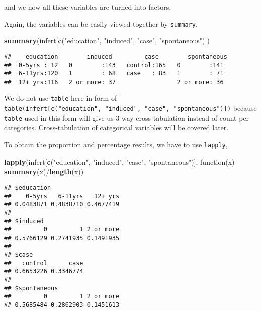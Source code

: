 \documentclass[]{book}
\newenvironment{Shaded}{\begin{snugshade}}{\end{snugshade}}
\newcommand{\KeywordTok}[1]{\textcolor[rgb]{0.13,0.29,0.53}{\textbf{{#1}}}}
\newcommand{\StringTok}[1]{\textcolor[rgb]{0.31,0.60,0.02}{{#1}}}
\newcommand{\NormalTok}[1]{{#1}}
\theoremstyle{definition}
\theoremstyle{definition}
\theoremstyle{remark}
\begin{document}
and we now all these variables are turned into factors.

Again, the variables can be easily viewed together by \texttt{summary},

\begin{Shaded}
\begin{Highlighting}[]
\KeywordTok{summary}\NormalTok{(infert[}\KeywordTok{c}\NormalTok{(}\StringTok{"education"}\NormalTok{, }\StringTok{"induced"}\NormalTok{, }\StringTok{"case"}\NormalTok{, }\StringTok{"spontaneous"}\NormalTok{)])}
\end{Highlighting}
\end{Shaded}

\begin{verbatim}
##    education        induced         case        spontaneous 
##  0-5yrs : 12   0        :143   control:165   0        :141  
##  6-11yrs:120   1        : 68   case   : 83   1        : 71  
##  12+ yrs:116   2 or more: 37                 2 or more: 36
\end{verbatim}

We do not use \texttt{table} here in form of
\texttt{table(infert{[}c("education",\ "induced",\ "case",\ "spontaneous"){]})}
because \texttt{table} used in this form will give us 3-way
cross-tabulation instead of count per categories. Cross-tabulation of
categorical variables will be covered later.

To obtain the proportion and percentage results, we have to use
\texttt{lapply},

\begin{Shaded}
\begin{Highlighting}[]
\KeywordTok{lapply}\NormalTok{(infert[}\KeywordTok{c}\NormalTok{(}\StringTok{"education"}\NormalTok{, }\StringTok{"induced"}\NormalTok{, }\StringTok{"case"}\NormalTok{, }\StringTok{"spontaneous"}\NormalTok{)], }
       \NormalTok{function(x) }\KeywordTok{summary}\NormalTok{(x)/}\KeywordTok{length}\NormalTok{(x))}
\end{Highlighting}
\end{Shaded}

\begin{verbatim}
## $education
##    0-5yrs   6-11yrs   12+ yrs 
## 0.0483871 0.4838710 0.4677419 
## 
## $induced
##         0         1 2 or more 
## 0.5766129 0.2741935 0.1491935 
## 
## $case
##   control      case 
## 0.6653226 0.3346774 
## 
## $spontaneous
##         0         1 2 or more 
## 0.5685484 0.2862903 0.1451613
\end{verbatim}
\end{document}
